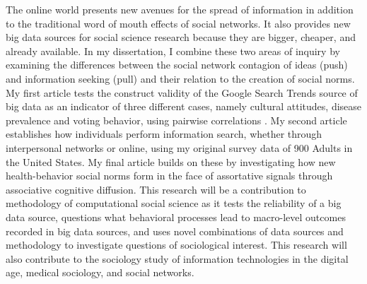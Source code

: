 The online world presents new avenues for the spread of information in addition to the traditional word of mouth effects of social networks. It also provides new big data sources for social science research because they are bigger, cheaper, and already available. In my dissertation, I combine these two areas of inquiry by examining the differences between the social network contagion of ideas (push) and information seeking (pull) and their relation to the creation of social norms. My first article tests the construct validity of the Google Search Trends source of big data as an indicator of three different cases, namely cultural attitudes, disease prevalence and voting behavior, using pairwise correlations . My second article establishes how individuals perform information search, whether through interpersonal networks or online, using my original survey data of 900 Adults in the United States. My final article builds on these by investigating how new health-behavior social norms form in the face of assortative signals through associative cognitive diffusion. This research will be a contribution to methodology of computational social science as it tests the reliability of a big data source, questions what behavioral processes lead to macro-level outcomes recorded in big data sources, and uses novel combinations of data sources and methodology to investigate questions of sociological interest. This research will also contribute to the sociology study of information technologies in the digital age, medical sociology, and social networks.